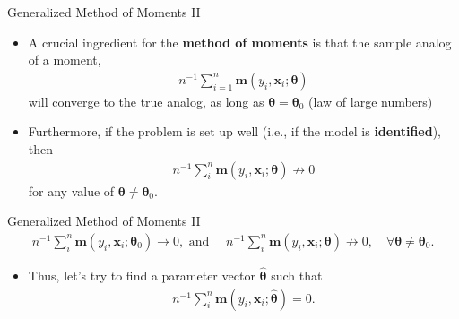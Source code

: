 \documentclass[aspectratio=169,11pt]{beamer}
\begin{document}
\begin{frame}{Generalized Method of Moments II}
\begin{itemize}
	\item A crucial ingredient for the {\bf method of moments} is that the sample analog of a moment,
	\begin{align*}
		n^{-1} \sum_{i=1}^n \symbf{m}\left(y_i,\symbf{x}_i;\symbf{\theta}\right)
	\end{align*}
	will converge to the true analog, as long as $\symbf{\theta} = \symbf{\theta}_0$ (law of large numbers)

	\medskip
	\item Furthermore, if the problem is set up well (i.e., if the model is {\bf identified}),
	then
	\begin{align*}
		n^{-1} \sum_{i}^{n}\symbf{m}\left(y_{i},\symbf{x}_{i};\symbf{\theta}\right)\nrightarrow 0
	\end{align*}
for any value of $\symbf{\theta}\ne\symbf{\theta}_{0}$.
	\end{itemize}
\end{frame}

\begin{frame}{Generalized Method of Moments II}
\begin{align*}
n^{-1}\sum_{i}^{n}\symbf{m}\left(y_{i},\symbf{x}_{i};\symbf{\theta}_{0}\right) \rightarrow 0, \text{ and } 
\quad n^{-1}\sum_{i}^{n}\symbf{m}\left(y_{i},\symbf{x}_{i};\symbf{\theta}\right)\nrightarrow 0, \quad \forall\symbf{\theta}\ne\symbf{\theta}_{0}.
\end{align*}
\begin{itemize}
\item Thus, let's try to find a parameter vector $\hat{\symbf{\theta}}$ such that 
	\begin{align*}
	n^{-1}\sum_{i}^{n} \symbf{m}\left(y_{i},\symbf{x}_{i};\hat{\symbf{\theta}}\right) = 0.
	\end{align*}
\end{itemize}
\end{frame}
\end{document}
